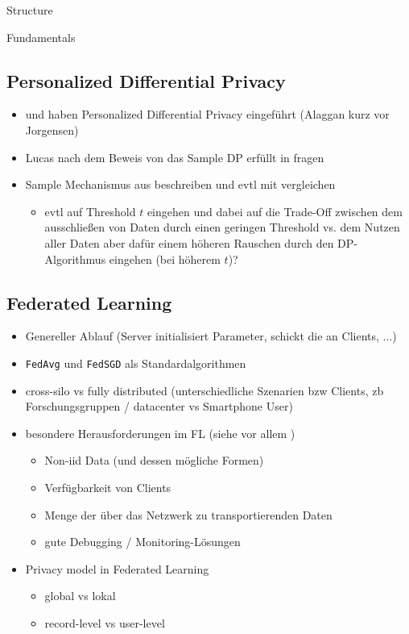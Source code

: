 \begin{chapter}{Structure}
\begin{section}{Fundamentals}
		\subsection{Personalized Differential Privacy}
		\begin{itemize}
			\item \cite{alaggan:2016} und \cite{jorgensen:2015} haben Personalized Differential Privacy eingeführt (Alaggan kurz vor Jorgensen)
			\item Lucas nach dem Beweis von das Sample DP erfüllt in \cite{jorgensen:2015} fragen
			\item Sample Mechanismus aus \cite{jorgensen:2015} beschreiben und evtl mit \cite{boenisch:2023} vergleichen
			\begin{itemize}
				\item evtl auf Threshold $t$ eingehen und dabei auf die Trade-Off zwischen dem ausschließen von Daten durch einen geringen Threshold vs. dem Nutzen aller Daten aber dafür einem höheren Rauschen durch den DP-Algorithmus eingehen (bei höherem $t$)?
			\end{itemize}
		\end{itemize}
		
		\subsection{Federated Learning}
		\begin{itemize}
			\item Genereller Ablauf (Server initialisiert Parameter, schickt die an Clients, ...)
			\item \texttt{FedAvg} und \texttt{FedSGD} als Standardalgorithmen
			\item cross-silo vs fully distributed (unterschiedliche Szenarien bzw Clients, zb Forschungsgruppen / datacenter vs Smartphone User)
			\item besondere Herausforderungen im FL (siehe vor allem \cite{kairouz:2021})
			\begin{itemize}
				\item Non-iid Data (und dessen mögliche Formen)
				\item Verfügbarkeit von Clients
				\item Menge der über das Netzwerk zu transportierenden Daten
				\item gute Debugging / Monitoring-Lösungen
			\end{itemize}
			\item Privacy model in Federated Learning
			\begin{itemize}
				\item global vs lokal
				\item record-level vs user-level
			\end{itemize}
		\end{itemize}
		

\end{section}
\end{chapter}
